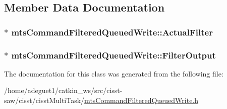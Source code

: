 \subsection{Member Data Documentation}
\hypertarget{classmts_command_filtered_queued_write_a718a512e857afbb05d1b4ab6886b57f5}{
\subsubsection[{Actual\-Filter}]{$\ast$ mts\-Command\-Filtered\-Queued\-Write\-::\-Actual\-Filter\hspace{0.3cm}{\ttfamily [protected]}}}\label{classmts_command_filtered_queued_write_a718a512e857afbb05d1b4ab6886b57f5}
\hypertarget{classmts_command_filtered_queued_write_a485105f94a78b6a6ef600c3dbf9140d0}{
\subsubsection[{Filter\-Output}]{$\ast$ mts\-Command\-Filtered\-Queued\-Write\-::\-Filter\-Output\hspace{0.3cm}{\ttfamily [protected]}}}\label{classmts_command_filtered_queued_write_a485105f94a78b6a6ef600c3dbf9140d0}


The documentation for this class was generated from the following file\-:\begin{DoxyCompactItemize}
\item 
/home/adeguet1/catkin\-\_\-ws/src/cisst-\/saw/cisst/cisst\-Multi\-Task/\hyperlink{mts_command_filtered_queued_write_8h}{mts\-Command\-Filtered\-Queued\-Write.\-h}\end{DoxyCompactItemize}

